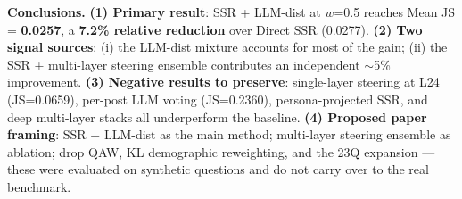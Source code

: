 \documentclass[10pt,a4paper]{article}
\begin{document}
\textbf{Conclusions.}
\textbf{(1) Primary result}: SSR + LLM-dist at $w$=0.5 reaches Mean JS = \textbf{0.0257}, a \textbf{7.2\% relative reduction} over Direct SSR (0.0277).
\textbf{(2) Two signal sources}: (i) the LLM-dist mixture accounts for most of the gain; (ii) the SSR + multi-layer steering ensemble contributes an independent $\sim$5\% improvement.
\textbf{(3) Negative results to preserve}: single-layer steering at L24 (JS=0.0659), per-post LLM voting (JS=0.2360), persona-projected SSR, and deep multi-layer stacks all underperform the baseline.
\textbf{(4) Proposed paper framing}: SSR + LLM-dist as the main method; multi-layer steering ensemble as ablation; drop QAW, KL demographic reweighting, and the 23Q expansion — these were evaluated on synthetic questions and do not carry over to the real benchmark.
\end{document}
